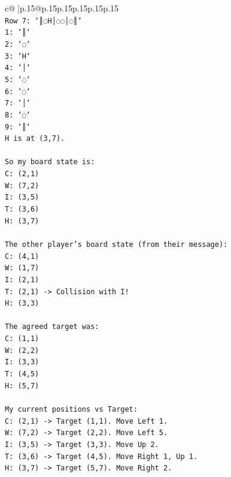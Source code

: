 \documentclass{article}
\begin{document}
{\begin{supertabular}{c@{$\;$}|p{.15\linewidth}@{}p{.15\linewidth}p{.15\linewidth}p{.15\linewidth}p{.15\linewidth}p{.15\linewidth}}
{{{\\ 
\texttt{Row 7: `║◌H│◌◌│◌║`} \\
\texttt{1: `║`} \\
\texttt{2: `◌`} \\
\texttt{3: `H`} \\
\texttt{4: `│`} \\
\texttt{5: `◌`} \\
\texttt{6: `◌`} \\
\texttt{7: `│`} \\
\texttt{8: `◌`} \\
\texttt{9: `║`} \\
\texttt{H is at (3,7).} \\
\\ 
\texttt{So my board state is:} \\
\texttt{C: (2,1)} \\
\texttt{W: (7,2)} \\
\texttt{I: (3,5)} \\
\texttt{T: (3,6)} \\
\texttt{H: (3,7)} \\
\\ 
\texttt{The other player's board state (from their message):} \\
\texttt{C: (4,1)} \\
\texttt{W: (1,7)} \\
\texttt{I: (2,1)} \\
\texttt{T: (2,1) {-}> Collision with I!} \\
\texttt{H: (3,3)} \\
\\ 
\texttt{The agreed target was:} \\
\texttt{C: (1,1)} \\
\texttt{W: (2,2)} \\
\texttt{I: (3,3)} \\
\texttt{T: (4,5)} \\
\texttt{H: (5,7)} \\
\\ 
\texttt{My current positions vs Target:} \\
\texttt{C: (2,1) {-}> Target (1,1). Move Left 1.} \\
\texttt{W: (7,2) {-}> Target (2,2). Move Left 5.} \\
\texttt{I: (3,5) {-}> Target (3,3). Move Up 2.} \\
\texttt{T: (3,6) {-}> Target (4,5). Move Right 1, Up 1.} \\
\texttt{H: (3,7) {-}> Target (5,7). Move Right 2.} \\
}}}
\end{supertabular}}
\end{document}
